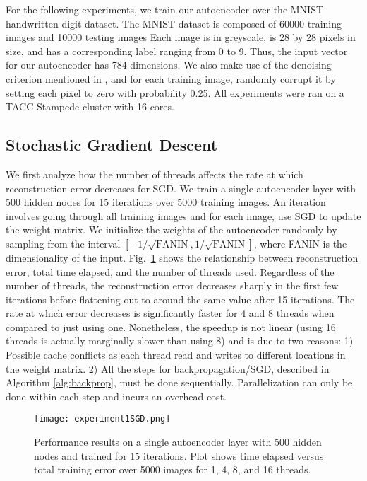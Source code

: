 \FloatBarrier

For the following experiments, we train our autoencoder over the MNIST handwritten digit
dataset. The MNIST dataset is composed of 60000 training images and 10000
testing images Each image is in greyscale, is 28 by 28 pixels in size, and has
a corresponding label ranging from 0 to 9. Thus, the input vector for our
autoencoder has 784 dimensions. We also make use of the denoising criterion
mentioned in \cite{vincent2010stacked}, and for each training image, randomly
corrupt it by setting each pixel to zero with probability 0.25. All experiments were ran on a TACC Stampede cluster with 16 cores. 

\subsection{Stochastic Gradient Descent}

We first analyze how the number of threads affects the rate at which reconstruction
error decreases for SGD. We train a single autoencoder layer with 500 hidden nodes for
15 iterations over 5000 training images. An iteration involves going through
all training images and for each image, use SGD to update the weight matrix. We initialize the weights of the autoencoder randomly by sampling from the interval $[-1/\sqrt{\text{FANIN}}, 1/\sqrt{\text{FANIN}}]$, where FANIN is the dimensionality of the input.
Fig.~\ref{fig:experiment1} shows the relationship between reconstruction error, total
time elapsed, and the number of threads used. Regardless of the number of
threads, the reconstruction error decreases sharply in the first few iterations
before flattening out to around the same value after 15 iterations. The rate at
which error decreases is significantly faster for 4 and 8 threads when
compared to just using one. Nonetheless, the speedup is not linear (using 16 threads is actually marginally slower than using 8) and is due
to two reasons: 1) Possible cache conflicts as each thread read and writes to
different locations in the weight matrix. 2) All the steps for
backpropagation/SGD, described in Algorithm \ref{alg:backprop}, must be done
sequentially. Parallelization can only be done within each step and incurs an
overhead cost.

\begin{figure}[h]
\centering
\texttt{[image: experiment1SGD.png]}
\caption{Performance results on a single autoencoder layer with 500 hidden nodes and trained for 15 iterations. Plot shows time elapsed versus total training error over 5000 images for 1, 4, 8, and 16 threads.}
\label{fig:experiment1}
\end{figure}


